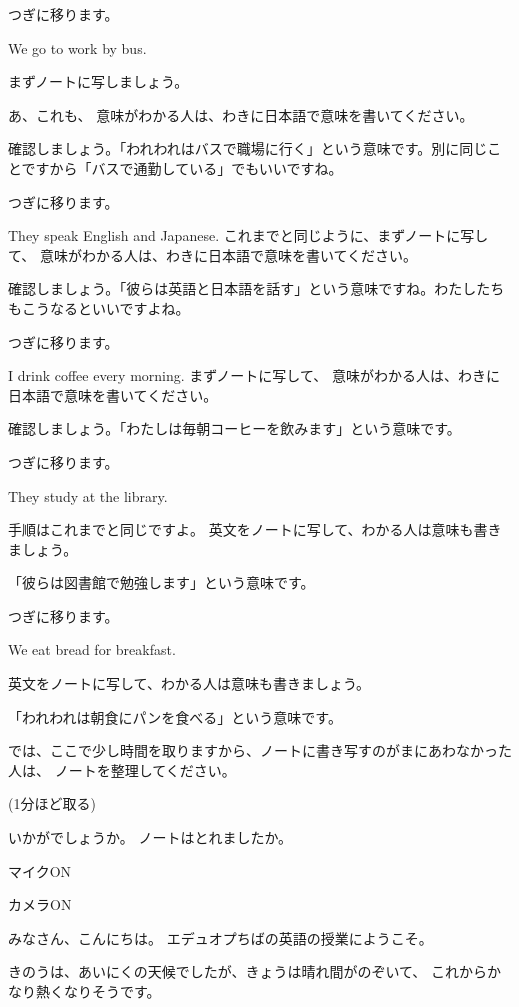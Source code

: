\documentclass[12pt]{jlreq}
\newenvironment{my_check}
  {\begin{itemize}
    \renewcommand\labelitemi{$\square\hspace{0.5em}$}} %
  {\end{itemize}}
\begin{document}
つぎに移ります。{\large \ComputerMouse}

We  go to work by bus.

まずノートに写しましょう。

あ、これも、
意味がわかる人は、わきに日本語で意味を書いてください。

{\large \ComputerMouse}確認しましょう。「われわれはバスで職場に行く」という意味です。別に同じことですから「バスで通勤している」でもいいですね。

つぎに移ります。

They speak English and Japanese.
これまでと同じように、まずノートに写して、
意味がわかる人は、わきに日本語で意味を書いてください。

確認しましょう。「彼らは英語と日本語を話す」という意味ですね。わたしたちもこうなるといいですよね。

つぎに移ります。

I drink coffee every morning.
まずノートに写して、
意味がわかる人は、わきに日本語で意味を書いてください。

確認しましょう。「わたしは毎朝コーヒーを飲みます」という意味です。

つぎに移ります。

They study at the library. 

手順はこれまでと同じですよ。
英文をノートに写して、わかる人は意味も書きましょう。

「彼らは図書館で勉強します」という意味です。

つぎに移ります。

We eat bread for breakfast.

英文をノートに写して、わかる人は意味も書きましょう。

「われわれは朝食にパンを食べる」という意味です。


では、ここで少し時間を取りますから、ノートに書き写すのがまにあわなかった人は、
ノートを整理してください。



(1分ほど取る)

いかがでしょうか。
ノートはとれましたか。
\newpage
\begin{my_check}
\item マイクON
\item カメラON
\end{my_check}

{\LARGE \ComputerMouse}

みなさん、こんにちは。
エデュオプちばの英語の授業にようこそ。

きのうは、あいにくの天候でしたが、きょうは晴れ間がのぞいて、
これからかなり熱くなりそうです。
\end{document}
